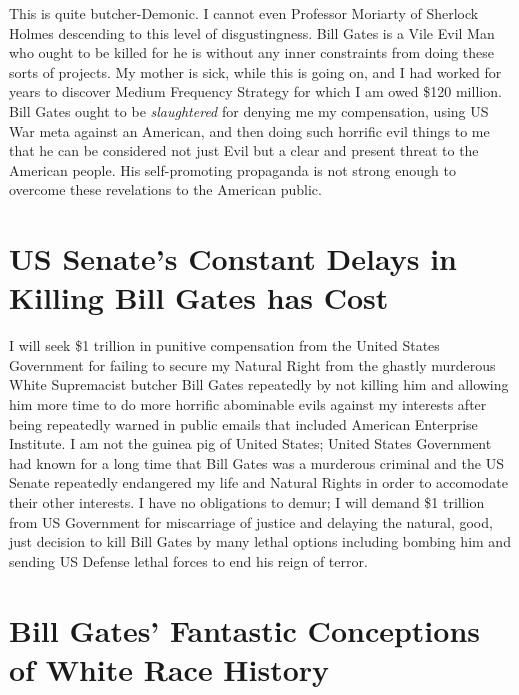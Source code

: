 \documentclass{amsart}
\begin{document}
This is quite butcher-Demonic.  I cannot even Professor Moriarty of Sherlock Holmes descending to this level of disgustingness.  Bill Gates is a Vile Evil Man who ought to be killed for he is without any inner constraints from doing these sorts of projects.  My mother is sick, while this is going on, and I had worked for years to discover Medium Frequency Strategy for which I am owed \$120 million.  Bill Gates ought to be {\em slaughtered} for denying me my compensation, using US War meta against an American, and then doing such horrific evil things to me that he can be considered not just Evil but a clear and present threat to the American people.  His self-promoting propaganda is not strong enough to overcome these revelations to the American public.

\section{US Senate's Constant Delays in Killing Bill Gates has Cost}

I will seek \$1 trillion in punitive compensation from the United States Government for failing to secure my Natural Right from the ghastly murderous White Supremacist butcher Bill Gates repeatedly by not killing him and allowing him more time to do more horrific abominable evils against my interests after being repeatedly warned in public emails that included American Enterprise Institute.  I am not the guinea pig of United States; United States Government had known for a long time that Bill Gates was a murderous criminal and the US Senate repeatedly endangered my life and Natural Rights in order to accomodate their other interests.  I have no obligations to demur; I will demand \$1 trillion from US Government for miscarriage of justice and delaying the natural, good, just decision to kill Bill Gates by many lethal options including bombing him and sending US Defense lethal forces to end his reign of terror.

\section{Bill Gates' Fantastic Conceptions of White Race History}
\end{document}
